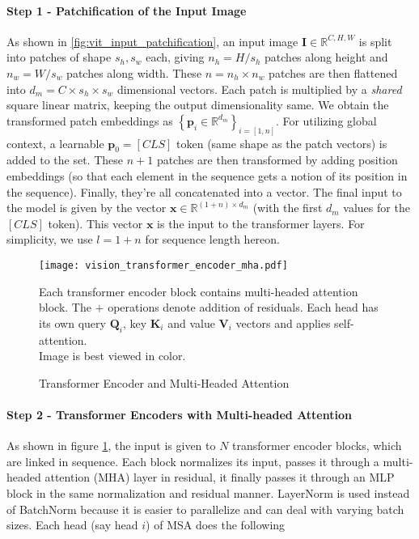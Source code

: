 \paragraph{Step 1 - Patchification of the Input Image}

As shown in \cref{fig:vit_input_patchification}, an input image
$\mathbf{I} \in \mathbb{R}^{C, H, W}$ is split into patches of shape
$s_h, s_w$ each, giving $n_h = H/s_h$ patches along height and $n_w =
W/s_w$ patches along width. These $n = n_h \times n_w$ patches are
then flattened into $d_m = C \times s_h \times s_w$ dimensional
vectors. Each patch is multiplied by a \emph{shared} square linear
matrix, keeping the output dimensionality same. We obtain the
transformed patch embeddings as $\left\{ \mathbf{p}_i \in
\mathbb{R}^{d_m} \right\}_{i = [1, n]}$. For utilizing global context,
a learnable $\mathbf{p}_0 = \left[CLS\right]$ token (same shape as the
patch vectors) is added to the set. These $n+1$ patches are then
transformed by adding position embeddings (so that each element in the
sequence gets a notion of its position in the sequence). Finally,
they're all concatenated into a vector. The final input to the model
is given by the vector $\mathbf{x} \in \mathbb{R}^{(1+n) \times d_m}$
(with the first $d_m$ values for the $\left[CLS\right]$ token). This
vector $\mathbf{x}$ is the input to the transformer layers. For
simplicity, we use $l = 1 + n$ for sequence length hereon.

\begin{figure}
    \centering
    \texttt{[image: vision\_transformer\_encoder\_mha.pdf]}
    \caption{Transformer Encoder and Multi-Headed Attention}
    \small
        Each transformer encoder block contains multi-headed attention
        block. The $+$ operations denote addition of residuals. Each
        head has its own query $\mathbf{Q}_i$, key $\mathbf{K}_i$ and
        value $\mathbf{V}_i$ vectors and applies self-attention. \\
        Image is best viewed in color.
    \label{fig:vit_encoder_mha}
\end{figure}

\paragraph{Step 2 - Transformer Encoders with Multi-headed Attention}

As shown in figure \cref{fig:vit_encoder_mha}, the input is given to
$N$ transformer encoder blocks, which are linked in sequence. Each
block normalizes its input, passes it through a multi-headed attention
(MHA) layer in residual, it finally passes it through an MLP block in
the same normalization and residual manner. LayerNorm
\cite{Ba2016LayerN} is used instead of BatchNorm
\cite{Ioffe2015BatchNA} because it is easier to parallelize and can
deal with varying batch sizes. Each head (say head $i$) of MSA does
the following


